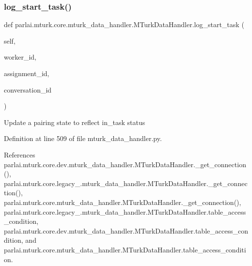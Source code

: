 \subsubsection{\texorpdfstring{log\+\_\+start\+\_\+task()}{log\_start\_task()}}
{\footnotesize\ttfamily def parlai.\+mturk.\+core.\+mturk\+\_\+data\+\_\+handler.\+M\+Turk\+Data\+Handler.\+log\+\_\+start\+\_\+task (\begin{DoxyParamCaption}\item[{}]{self,  }\item[{}]{worker\+\_\+id,  }\item[{}]{assignment\+\_\+id,  }\item[{}]{conversation\+\_\+id }\end{DoxyParamCaption})}

\begin{DoxyVerb}Update a pairing state to reflect in_task status\end{DoxyVerb}
 

Definition at line 509 of file mturk\+\_\+data\+\_\+handler.\+py.



References parlai.\+mturk.\+core.\+dev.\+mturk\+\_\+data\+\_\+handler.\+M\+Turk\+Data\+Handler.\+\_\+get\+\_\+connection(), parlai.\+mturk.\+core.\+legacy\+\_.\+mturk\+\_\+data\+\_\+handler.\+M\+Turk\+Data\+Handler.\+\_\+get\+\_\+connection(), parlai.\+mturk.\+core.\+mturk\+\_\+data\+\_\+handler.\+M\+Turk\+Data\+Handler.\+\_\+get\+\_\+connection(), parlai.\+mturk.\+core.\+legacy\+\_.\+mturk\+\_\+data\+\_\+handler.\+M\+Turk\+Data\+Handler.\+table\+\_\+access\+\_\+condition, parlai.\+mturk.\+core.\+dev.\+mturk\+\_\+data\+\_\+handler.\+M\+Turk\+Data\+Handler.\+table\+\_\+access\+\_\+condition, and parlai.\+mturk.\+core.\+mturk\+\_\+data\+\_\+handler.\+M\+Turk\+Data\+Handler.\+table\+\_\+access\+\_\+condition.

